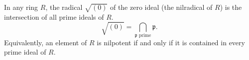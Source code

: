 In any ring $R$, the radical $\sqrt{(0)}$ of the zero ideal (the nilradical of $R$) is the intersection of all prime ideals of $R$.
$$\sqrt{(0)} = \bigcap_{\mathfrak{p} \text{ prime}} \mathfrak{p}.$$
Equivalently, an element of $R$ is nilpotent if and only if it is contained in every prime ideal of $R$.
